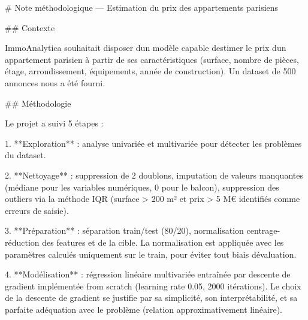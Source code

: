 \documentclass[
  french,
  11pt,
  a4paper,
]{scrbook}
\newenvironment{Shaded}{}{}
\newcommand{\FunctionTok}[1]{\textcolor[rgb]{0.44,0.26,0.76}{#1}}
\newcommand{\NormalTok}[1]{\textcolor[rgb]{0.14,0.16,0.18}{#1}}
\newcommand{\SpecialStringTok}[1]{\textcolor[rgb]{0.01,0.18,0.38}{#1}}
\begin{document}
\begin{tcolorbox}[enhanced jigsaw, arc=.35mm, bottomrule=.15mm, bottomtitle=1mm, breakable, colback=white, colbacktitle=quarto-callout-tip-color!10!white, colframe=quarto-callout-tip-color-frame, coltitle=black, left=2mm, leftrule=.75mm, opacityback=0, opacitybacktitle=0.6, rightrule=.15mm, title=\textcolor{quarto-callout-tip-color}{\faLightbulb}\hspace{0.5em}{✅ Exemple de note méthodologique}, titlerule=0mm, toprule=.15mm, toptitle=1mm]

\begin{Shaded}
\begin{Highlighting}[]
\FunctionTok{\# Note méthodologique — Estimation du prix des appartements parisiens}

\FunctionTok{\#\# Contexte}

\NormalTok{ImmoAnalytica souhaitait disposer d\textquotesingle{}un modèle capable d\textquotesingle{}estimer }
\NormalTok{le prix d\textquotesingle{}un appartement parisien à partir de ses caractéristiques }
\NormalTok{(surface, nombre de pièces, étage, arrondissement, équipements, }
\NormalTok{année de construction). Un dataset de 500 annonces nous a été fourni.}

\FunctionTok{\#\# Méthodologie}

\NormalTok{Le projet a suivi 5 étapes :}

\SpecialStringTok{1. }\NormalTok{**Exploration** : analyse univariée et multivariée pour détecter }
\NormalTok{les problèmes du dataset.}

\SpecialStringTok{2. }\NormalTok{**Nettoyage** : suppression de 2 doublons, imputation de valeurs }
\NormalTok{manquantes (médiane pour les variables numériques, 0 pour le balcon), }
\NormalTok{suppression des outliers via la méthode IQR (surface \textgreater{} 200 m² et }
\NormalTok{prix \textgreater{} 5 M€ identifiés comme erreurs de saisie).}

\SpecialStringTok{3. }\NormalTok{**Préparation** : séparation train/test (80/20), normalisation }
\NormalTok{centrage{-}réduction des features et de la cible. La normalisation est }
\NormalTok{appliquée avec les paramètres calculés uniquement sur le train, }
\NormalTok{pour éviter tout biais d\textquotesingle{}évaluation.}

\SpecialStringTok{4. }\NormalTok{**Modélisation** : régression linéaire multivariée entraînée par }
\NormalTok{descente de gradient implémentée from scratch (learning rate 0.05, }
\NormalTok{2000 itérations). Le choix de la descente de gradient se justifie par }
\NormalTok{sa simplicité, son interprétabilité, et sa parfaite adéquation avec }
\NormalTok{le problème (relation approximativement linéaire).}


\end{Highlighting}
\end{Shaded}
\end{tcolorbox}
\end{document}
